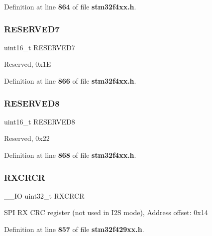 Definition at line \textbf{ 864} of file \textbf{ stm32f4xx.\+h}.

\mbox{\label{structSPI__TypeDef_ab1820c97e368d349f5f4121f015d9fab}} 
\subsubsection{R\+E\+S\+E\+R\+V\+E\+D7}
{\footnotesize\ttfamily uint16\+\_\+t R\+E\+S\+E\+R\+V\+E\+D7}

Reserved, 0x1E 

Definition at line \textbf{ 866} of file \textbf{ stm32f4xx.\+h}.

\mbox{\label{structSPI__TypeDef_afc22764fbf9ee7ce28174d65d0260f18}} 
\subsubsection{R\+E\+S\+E\+R\+V\+E\+D8}
{\footnotesize\ttfamily uint16\+\_\+t R\+E\+S\+E\+R\+V\+E\+D8}

Reserved, 0x22 

Definition at line \textbf{ 868} of file \textbf{ stm32f4xx.\+h}.

\mbox{\label{structSPI__TypeDef_a2cf9dcd9008924334f20f0dc6b57042e}} 
\subsubsection{R\+X\+C\+R\+CR\hspace{0.1cm}{\footnotesize\ttfamily [1/2]}}
{\footnotesize\ttfamily \+\_\+\+\_\+\+IO uint32\+\_\+t R\+X\+C\+R\+CR}

S\+PI RX C\+RC register (not used in I2S mode), Address offset\+: 0x14 

Definition at line \textbf{ 857} of file \textbf{ stm32f429xx.\+h}.

\mbox{\label{structSPI__TypeDef_a7ad53aa3735ccdd785e3eec02faf5eb9}} 

